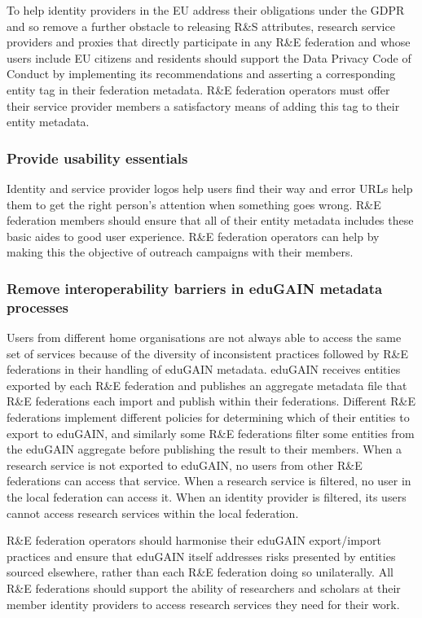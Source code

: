\documentclass[fleqn,10pt]{wlscirep}
\begin{document}
{To help identity providers in the EU address their obligations under the GDPR and so remove a further obstacle to releasing R\&S attributes, research service providers and proxies that directly participate in any R\&E federation and whose users include EU citizens and residents should support the Data Privacy Code of Conduct by implementing its recommendations and asserting a corresponding entity tag in their federation metadata. R\&E federation operators must offer their service provider members a satisfactory means of adding this tag to their entity metadata.

\subsubsection{Provide usability essentials}
Identity and service provider logos help users find their way and error URLs help them to get the right person’s attention when something goes wrong. R\&E federation members should ensure that all of their entity metadata includes these basic aides to good user experience. R\&E federation operators can help by making this the objective of outreach campaigns with their members.

\subsubsection{Remove interoperability barriers in eduGAIN metadata processes}
Users from different home organisations are not always able to access the same set of services because of the diversity of inconsistent practices followed by R\&E federations in their handling of eduGAIN metadata. eduGAIN receives entities exported by each R\&E federation and publishes an aggregate  metadata  file  that R\&E federations each import and publish within their federations.  Different R\&E federations implement different policies for determining which of their entities to export to eduGAIN, and similarly some R\&E federations filter some entities from the eduGAIN aggregate before publishing the result to their members. When a research service is not exported to eduGAIN, no users from other R\&E federations can access that service. When a research service is filtered, no user in the local federation can access it. When an identity provider is filtered, its users cannot access research services within the local federation.

R\&E federation operators should harmonise their eduGAIN export/import practices and ensure that eduGAIN itself addresses risks presented by entities sourced elsewhere, rather than each R\&E federation doing so unilaterally. All R\&E federations should support the ability of researchers and scholars at their member identity providers to access research services they need for their work.

}
\end{document}
